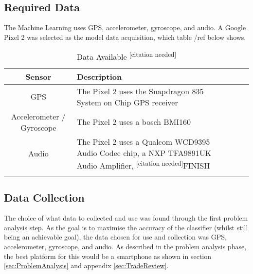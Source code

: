 \documentclass{UoNMCHA}
\newcommand{\citationneeded}{\textsuperscript{\color{blue} [citation needed]}}
\numberwithin{equation}{section}
\begin{document}
\subsection{Required Data}
The Machine Learning uses GPS, accelerometer, gyroscope, and audio. A Google Pixel 2 was selected as the model data acquisition, which table /ref{} below shows.
\begin{table}[h!]
    \begin{center}
        \caption{Data Available\citationneeded}\label{tab:AndroidDataAvailable}
        {\footnotesize
            \begin{tabular}{c l l l|}
                \hline\hline Sensor & Description \\ \hline 
                GPS & The Pixel 2 uses the Snapdragon 835 System on Chip GPS receiver\\
                Accelerometer / Gyroscope & The Pixel 2 uses a bosch BMI160 \\
                Audio & The Pixel 2 uses a Qualcom WCD9395 Audio Codec chip, a NXP TFA9891UK Audio Amplifier, \citationneeded FINISH \\
                \\ \hline
            \end{tabular}
        }
    \end{center}
\end{table}

\subsection{Data Collection}

The choice of what data to collected and use was found through the first problem analysis step. As the goal is to maximise the accuracy of the classifier (whilst still being an achievable goal), the data chosen for use and collection was GPS, accelerometer, gyroscope, and audio. As described in the problem analysis phase, the best platform for this would be a smartphone as shown in section \ref{sec:ProblemAnalysis} and appendix \ref{sec:TradeReview}. 

\end{document}
